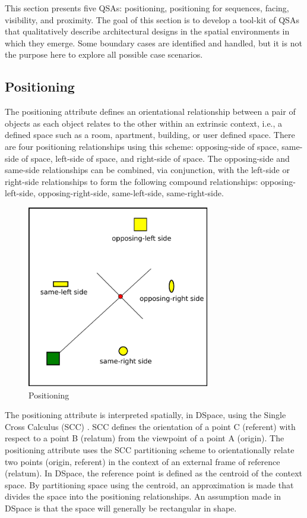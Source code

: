 \documentclass[12pt]{ucthesis}
\begin{document}
This section presents five QSAs: positioning, positioning for sequences, facing, visibility, and proximity. The goal of this section is to develop a tool-kit of QSAs that qualitatively describe architectural designs in the spatial environments in which they emerge. Some boundary cases are identified and handled, but it is not the purpose here to explore all possible case scenarios.

\subsection{Positioning}
The positioning attribute defines an orientational relationship between a pair of objects as each object relates to the other within an extrinsic context, i.e., a defined space such as a room, apartment, building, or user defined space. There are four positioning relationships using this scheme: opposing-side of space, same-side of space, left-side of space, and right-side of space. The opposing-side and same-side relationships can be combined, via conjunction, with the left-side or right-side relationships to form the following compound relationships: opposing-left-side, opposing-right-side, same-left-side, same-right-side.

\begin{figure}[H]
\centering
\includegraphics[width=80mm]{position}
\caption{Positioning}
\label{position}
\end{figure}

The positioning attribute is interpreted spatially, in DSpace, using the Single Cross Calculus (SCC) \cite{Freksa92usingorientation}. SCC defines the orientation of a point C (referent) with respect to a point B (relatum) from the viewpoint of a point A (origin). The positioning attribute uses the SCC partitioning scheme to orientationally relate two points (origin, referent) in the context of an external frame of reference (relatum). In DSpace, the reference point is defined as the centroid of the context space. By partitioning space using the centroid, an approximation is made that divides the space into the positioning relationships. An assumption made in DSpace is that the space will generally be rectangular in shape.
\end{document}

